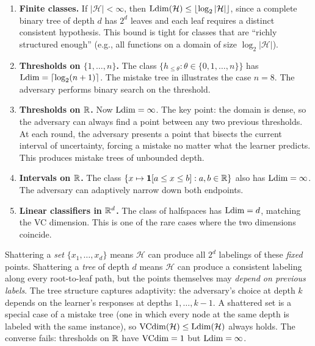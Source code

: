 \begin{example}
\label{ex:ldim-examples}
\begin{enumerate}[label=(\alph*), leftmargin=*, itemsep=4pt]
\item \textbf{Finite classes.} If $|\mathcal{H}| < \infty$, then $\mathrm{Ldim}(\mathcal{H}) \leq \lfloor \log_2 |\mathcal{H}| \rfloor$, since a complete binary tree of depth $d$ has $2^d$ leaves and each leaf requires a distinct consistent hypothesis. This bound is tight for classes that are ``richly structured enough'' (e.g., all functions on a domain of size $\log_2 |\mathcal{H}|$).

\item \textbf{Thresholds on $\{1, \ldots, n\}$.} The class $\{h_{\leq \theta} : \theta \in \{0, 1, \ldots, n\}\}$ has $\mathrm{Ldim} = \lceil \log_2(n+1) \rceil$. The mistake tree in  illustrates the case $n = 8$. The adversary performs binary search on the threshold.

\item \textbf{Thresholds on $\mathbb{R}$.} Now $\mathrm{Ldim} = \infty$. The key point: the domain is dense, so the adversary can always find a point between any two previous thresholds. At each round, the adversary presents a point that bisects the current interval of uncertainty, forcing a mistake no matter what the learner predicts. This produces mistake trees of unbounded depth.

\item \textbf{Intervals on $\mathbb{R}$.} The class $\{x \mapsto \mathbf{1}[a \leq x \leq b] : a, b \in \mathbb{R}\}$ also has $\mathrm{Ldim} = \infty$. The adversary can adaptively narrow down both endpoints.

\item \textbf{Linear classifiers in $\mathbb{R}^d$.} The class of halfspaces has $\mathrm{Ldim} = d$, matching the VC dimension. This is one of the rare cases where the two dimensions coincide.
\end{enumerate}
\end{example}

\begin{remark}
\label{rmk:sets-vs-trees}
Shattering a \emph{set} $\{x_1, \ldots, x_d\}$ means $\mathcal{H}$ can produce all $2^d$ labelings of these \emph{fixed} points. Shattering a \emph{tree} of depth $d$ means $\mathcal{H}$ can produce a consistent labeling along every root-to-leaf path, but the points themselves may \emph{depend on previous labels}. The tree structure captures adaptivity: the adversary's choice at depth $k$ depends on the learner's responses at depths $1, \ldots, k-1$. A shattered set is a special case of a mistake tree (one in which every node at the same depth is labeled with the same instance), so $\mathrm{VCdim}(\mathcal{H}) \leq \mathrm{Ldim}(\mathcal{H})$ always holds. The converse fails: thresholds on $\mathbb{R}$ have $\mathrm{VCdim} = 1$ but $\mathrm{Ldim} = \infty$.
\end{remark}

